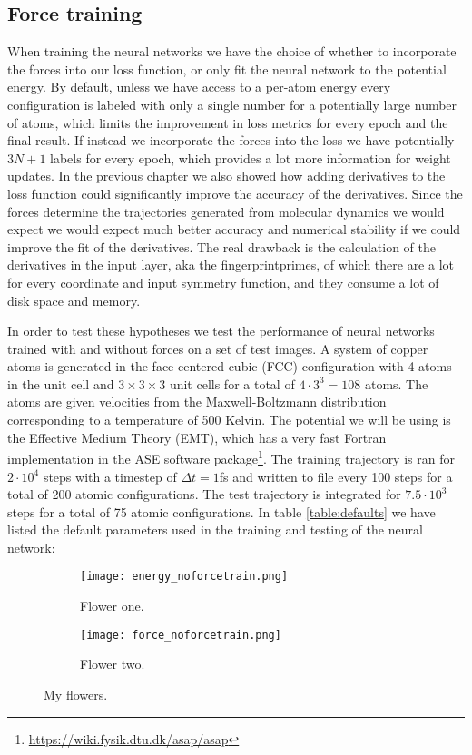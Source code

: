 \subsection{Force training}
When training the neural networks we have the choice of whether
to incorporate the forces into our loss function, or only fit
the neural network to the potential energy. By default, unless
we have access to a per-atom energy every configuration is labeled
with only a single number for a potentially large number of atoms,
which limits the improvement in loss metrics for every epoch
and the final result. If instead we incorporate the forces into the
loss we have potentially $3N + 1$ labels for every epoch,
which provides a lot more information for weight updates.
In the previous chapter we also showed how adding derivatives to
the loss function could significantly improve the accuracy of the
derivatives. Since the forces determine the trajectories generated
from molecular dynamics we would expect we would expect much better
accuracy and numerical stability if we could improve the fit of
the derivatives.
The real drawback is the calculation of the derivatives in the input layer,
aka the fingerprintprimes, of which there are a lot for every coordinate
and input symmetry function, and they consume a lot of disk space and memory.
\par
In order to test these hypotheses we test the performance of neural networks
trained with and without forces on a set of test images.
A system of copper atoms is generated in the face-centered cubic (FCC)
configuration with 4 atoms in the unit cell and $3 \times 3 \times 3$
unit cells for a total of $4 \cdot 3^3 = 108$ atoms. The
atoms are given velocities from the Maxwell-Boltzmann distribution
corresponding to a temperature of 500 Kelvin. The potential we will
be using is the Effective Medium Theory (EMT), which has a very
fast Fortran implementation in the ASE software package\footnote{
\url{https://wiki.fysik.dtu.dk/asap/asap}}.
The training trajectory is ran for $2 \cdot 10^4$ steps with
a timestep of $\Delta t = 1$fs and written to file every 100 steps
for a total of 200 atomic configurations. The test trajectory is
integrated for $7.5 \cdot 10^3$ steps for a total of 75 atomic configurations.
In table \ref{table:defaults} we have listed the default parameters
used in the training and testing of the neural network:


\begin{figure}[!tbp]
\begin{adjustbox}{max width=1.2\linewidth,center}
\centering
  \begin{subfigure}[b]{0.55\textwidth}
      \texttt{[image: energy\_noforcetrain.png]}
    \caption{Flower one.}
    \label{fig:f1}
  \end{subfigure}
  \hfill
  \begin{subfigure}[b]{0.55\textwidth}
      \texttt{[image: force\_noforcetrain.png]}
    \caption{Flower two.}
    \label{fig:f2}
  \end{subfigure}
\end{adjustbox}
\caption{My flowers.}
\end{figure}

